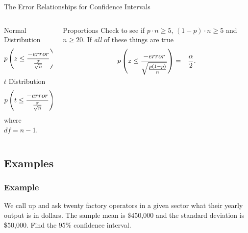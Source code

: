 \begin{frame}{The Error Relationships for Confidence Intervals}

  \begin{columns}[T]

    \begin{column}[T]{0.5\textwidth}
      \begin{block}{\color{red}Normal Distribution}
        \begin{eqnarray*}
          p\left( z \leq \frac{-error}{\frac{\sigma}{\sqrt{n}}}\right) & = & \frac{\alpha}{2}.
        \end{eqnarray*}
      \end{block}

      \begin{block}{\color{red}$t$ Distribution}
        \begin{eqnarray*}
          p\left( t \leq \frac{-error}{\frac{\sigma}{\sqrt{n}}}\right) & = & \frac{\alpha}{2},
        \end{eqnarray*}
        where $df=n-1$.
      \end{block}
    \end{column}


    \begin{column}[T]{0.5\textwidth}
      \begin{block}{\color{red}Proportions}
        Check to see if $p\cdot n \geq 5$, $(1-p)\cdot n \geq 5$ and
        $n\geq 20$. If \textit{all} of these things are true
        \begin{eqnarray*}
          p\left( z \leq \frac{-error}{\sqrt{\frac{p(1-p)}{n}}} \right) & = & \frac{\alpha}{2}.
        \end{eqnarray*}
      \end{block}
    \end{column}
  \end{columns}
  
\end{frame}



\subsection{Examples}


\begin{frame}
  \frametitle{Example}

  We call up and ask twenty factory operators in a given sector what
  their yearly output is in dollars. The sample mean is \$450,000 and
  the  standard deviation is
  \$50,000. Find the 95\% confidence interval.

  \vfill


  \vfill

\end{frame}


